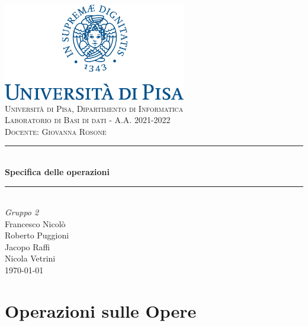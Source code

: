 \documentclass[a4paper,11pt]{article}
\newcommand{\HRule}{\rule{\linewidth}{0.5mm}} 	%
\begin{document}
\begin{titlepage}
\center
\includegraphics[width=0.6\textwidth]{img/unipi-logo.png}\\[1cm]

\textsc{\LARGE Università di Pisa, Dipartimento di Informatica}\\[1cm]

\textsc{\Large Laboratorio di Basi di dati - A.A. 2021-2022}\\[0.2cm]
\textsc{\large Docente: Giovanna Rosone}\\[1cm]

\HRule \\[0.8cm]
{ \huge \bfseries Specifica delle operazioni}\\[0.7cm]
\HRule \\[2cm]

\Huge \emph{Gruppo 2}\\[0.5cm]
\large Francesco Nicolò\\Roberto Puggioni\\Jacopo Raffi\\Nicola Vetrini\\[1.5cm]
{\large \today}\\[5cm]

\vfill
\end{titlepage}

\newpage
\tableofcontents
\newpage

\section{Operazioni sulle Opere}

\end{document}
